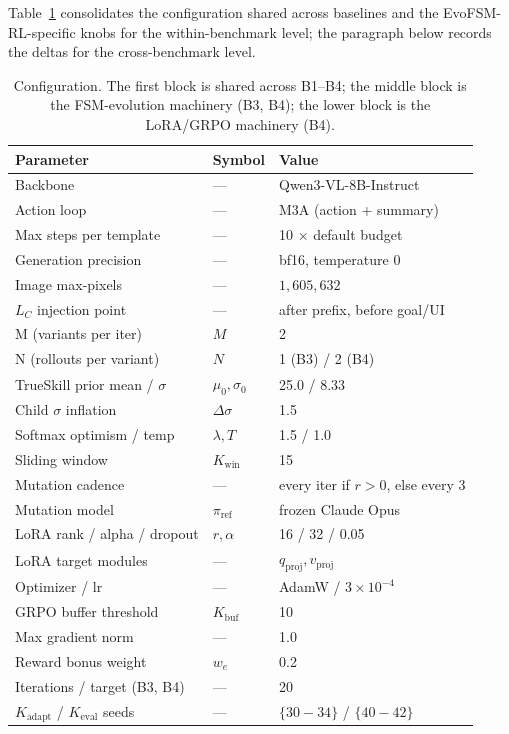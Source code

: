 Table~\ref{tab:hyper} consolidates the configuration shared across baselines and
the EvoFSM-RL-specific knobs for the within-benchmark level; the paragraph below
records the deltas for the cross-benchmark level.

\begin{table}[t]
\small
\centering
\begin{tabular}{lll}
\hline
\textbf{Parameter} & \textbf{Symbol} & \textbf{Value} \\
\hline
Backbone & --- & Qwen3-VL-8B-Instruct \\
Action loop & --- & M3A (action + summary) \\
Max steps per template & --- & 10 $\times$ default budget \\
Generation precision & --- & bf16, temperature $0$ \\
Image max-pixels & --- & $1{,}605{,}632$ \\
\hline
$L_C$ injection point & --- & after prefix, before goal/UI \\
\hline
M (variants per iter) & $M$ & 2 \\
N (rollouts per variant) & $N$ & 1 (B3) / 2 (B4) \\
TrueSkill prior mean / $\sigma$ & $\mu_0,\sigma_0$ & 25.0 / 8.33 \\
Child $\sigma$ inflation & $\Delta\sigma$ & 1.5 \\
Softmax optimism / temp & $\lambda,T$ & 1.5 / 1.0 \\
Sliding window & $K_{\text{win}}$ & 15 \\
Mutation cadence & --- & every iter if $r{>}0$, else every 3 \\
Mutation model & $\pi_{\text{ref}}$ & frozen Claude Opus \\
\hline
LoRA rank / alpha / dropout & $r,\alpha$ & 16 / 32 / 0.05 \\
LoRA target modules & --- & $q_{\text{proj}}, v_{\text{proj}}$ \\
Optimizer / lr & --- & AdamW / $3\!\times\!10^{-4}$ \\
GRPO buffer threshold & $K_{\text{buf}}$ & 10 \\
Max gradient norm & --- & 1.0 \\
Reward bonus weight & $w_e$ & 0.2 \\
\hline
Iterations / target (B3, B4) & --- & 20 \\
$K_{\text{adapt}}$ / $K_{\text{eval}}$ seeds & --- & $\{30\!-\!34\}$ / $\{40\!-\!42\}$ \\
\hline
\end{tabular}
\caption{Configuration. The first block is shared across B1--B4; the middle block
is the FSM-evolution machinery (B3, B4); the lower block is the LoRA/GRPO
machinery (B4).}
\label{tab:hyper}
\end{table}

